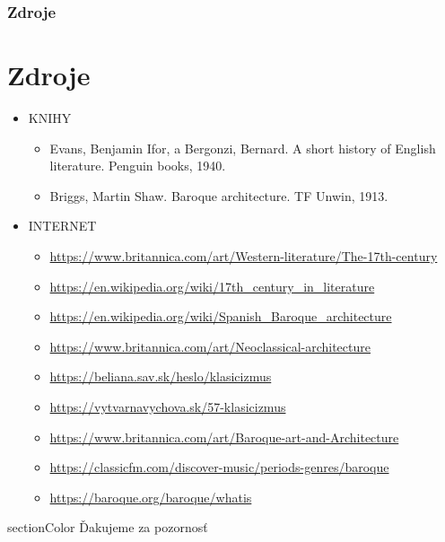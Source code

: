 \documentclass[dvipsnames]{beamer}
\begin{document}
\begin{frame}
	\frametitle{Zdroje}
	\section{Zdroje}
	\begin{itemize}
		\large \item KNIHY
		      \begin{itemize}\tiny
			      \item Evans, Benjamin Ifor, a Bergonzi, Bernard. A short history of English literature. Penguin books, 1940.
			      \item Briggs, Martin Shaw. Baroque architecture. TF Unwin, 1913.
		      \end{itemize}
		      \large \item INTERNET
		      \begin{itemize}\tiny

			      \item   \url{https://www.britannica.com/art/Western-literature/The-17th-century}%
			      \item   \url{https://en.wikipedia.org/wiki/17th\_century\_in\_literature}%
			      \item	\url{https://en.wikipedia.org/wiki/Spanish\_Baroque\_architecture}

			      \item   \url{https://www.britannica.com/art/Neoclassical-architecture}
			      \item   \url{https://beliana.sav.sk/heslo/klasicizmus}
			      \item   \url{https://vytvarnavychova.sk/57-klasicizmus}
			      \item   \url{https://www.britannica.com/art/Baroque-art-and-Architecture}
			      \item   \url{https://classicfm.com/discover-music/periods-genres/baroque}
			      \item   \url{https://baroque.org/baroque/whatis}
		      \end{itemize}
	\end{itemize}
\end{frame}
\begin{frame}
	\begin{beamercolorbox}[sep=12pt,center]{sectionColor}%
		Ďakujeme za pozornosť\par
	\end{beamercolorbox}
\end{frame}
\end{document}
